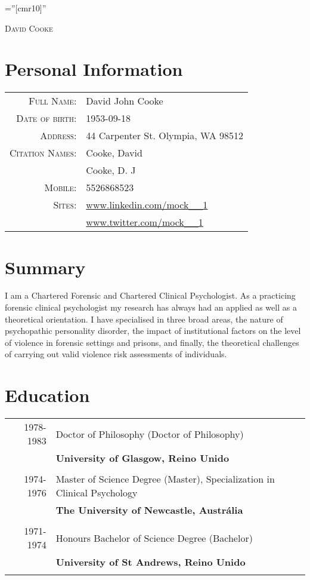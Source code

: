 \documentclass [a4paper,10pt]{article}
\begin{document}
\pagestyle{empty} %

\font\fb=''[cmr10]'' %

\par{\centering
		{\Huge   \textsc{David Cooke }
	}\bigskip\par}

\section{Personal Information}

\begin{tabular}{rl}
    \textsc{Full Name:} & David John Cooke \\    \textsc{Date of birth:} & 1953-09-18 \\	\textsc{Address:}   & 44 Carpenter St.
    Olympia, WA 98512\\    \textsc{Citation Names:}   & Cooke, David \\ & Cooke, D. J\\	\textsc{Mobile:}     & 5526868523\\	\textsc{Sites:}     & \url{www.linkedin.com/mock__1} \\ & \url{www.twitter.com/mock__1}\\	\end{tabular}

\section{Summary}
I am a Chartered Forensic and Chartered Clinical Psychologist. As a practicing forensic clinical psychologist my research has always had an applied as well as a theoretical orientation. I have specialised in three broad areas, the nature of psychopathic personality disorder, the impact of institutional factors on the level of violence in forensic settings and prisons, and finally, the theoretical challenges of carrying out valid violence risk assessments of individuals. \\
\section{Education}
\begin{tabular}{r p{11cm}}	
\\
\textsc{1978-1983} & Doctor of Philosophy (Doctor of Philosophy) \\ & \textbf{University of Glasgow, Reino Unido}\\
\\\textsc{1974-1976} & Master of Science Degree (Master), Specialization in Clinical Psychology  \\ & \textbf{The University of Newcastle, Austrália}\\
\\\textsc{1971-1974} & Honours Bachelor of Science Degree (Bachelor) \\ & \textbf{University of St Andrews, Reino Unido}\\
\\
\end{tabular}
\end{document}
